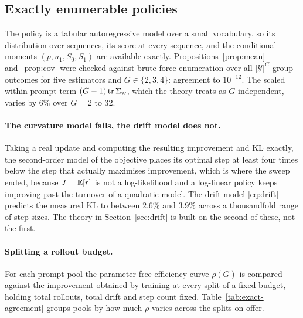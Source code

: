 \subsection{Exactly enumerable policies}

The policy is a tabular autoregressive model over a small vocabulary, so its distribution over
sequences, its score at every sequence, and the conditional moments $(p, u_1, S_0, S_1)$ are
available exactly. Propositions~\ref{prop:mean} and~\ref{prop:cov} were checked against
brute-force enumeration over all $|\mathcal{Y}|^{G}$ group outcomes for five estimators and
$G \in \{2,3,4\}$: agreement to $10^{-12}$. The scaled within-prompt term $(G-1)\operatorname{tr}\Sigma_{\mathrm{w}}$, which the
theory treats as $G$-independent, varies by $6\%$ over $G = 2$ to $32$.

\paragraph{The curvature model fails, the drift model does not.} Taking a real update and computing
the resulting improvement and KL exactly, the second-order model of the objective places its optimal
step at least four times below the step that actually maximises improvement, which is where the
sweep ended, because $J = \mathbb{E}[r]$ is
not a log-likelihood and a log-linear policy keeps improving past the turnover of a quadratic model.
The drift model \eqref{eq:drift} predicts the measured KL to between $2.6\%$ and $3.9\%$ across a thousandfold range of step sizes. The theory in Section~\ref{sec:drift} is built on the second of these, not
the first.

\paragraph{Splitting a rollout budget.} For each prompt pool the parameter-free efficiency curve
$\rho(G)$ is compared against the improvement obtained by training at every split of a fixed budget,
holding total rollouts, total drift and step count fixed. Table~\ref{tab:exact-agreement} groups
pools by how much $\rho$ varies across the splits on offer.

\begin{table}[t]
  \centering
  
  \caption{Agreement between the predicted efficiency and the measured gain in the enumerable
  testbed, as a function of how strongly the prediction discriminates between splits. The prediction
  has no free parameters. Pools where it predicts that the split hardly matters are the pools where
  the measured curves are flat to within their standard errors.}
  \label{tab:exact-agreement}
\end{table}

